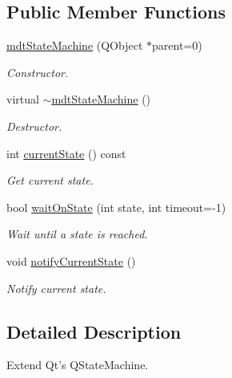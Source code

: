\subsection*{Public Member Functions}
\begin{DoxyCompactItemize}
\item 
\hyperlink{classmdt_state_machine_af2b15b9b0bbf48c6adb75a69dd255718}{mdtStateMachine} (QObject $\ast$parent=0)
\begin{DoxyCompactList}\small\item\em Constructor. \end{DoxyCompactList}\item 
\hypertarget{classmdt_state_machine_ac32776aa0587ec290576e6e2cafb631f}{
virtual \hyperlink{classmdt_state_machine_ac32776aa0587ec290576e6e2cafb631f}{$\sim$mdtStateMachine} ()}
\label{classmdt_state_machine_ac32776aa0587ec290576e6e2cafb631f}

\begin{DoxyCompactList}\small\item\em Destructor. \end{DoxyCompactList}\item 
\hypertarget{classmdt_state_machine_a16a99b2d6d077e1ea39622ef0e2b5a5b}{
int \hyperlink{classmdt_state_machine_a16a99b2d6d077e1ea39622ef0e2b5a5b}{currentState} () const }
\label{classmdt_state_machine_a16a99b2d6d077e1ea39622ef0e2b5a5b}

\begin{DoxyCompactList}\small\item\em Get current state. \end{DoxyCompactList}\item 
bool \hyperlink{classmdt_state_machine_ab14dc03757e493d35d510af8a1b436b6}{waitOnState} (int state, int timeout=-\/1)
\begin{DoxyCompactList}\small\item\em Wait until a state is reached. \end{DoxyCompactList}\item 
void \hyperlink{classmdt_state_machine_a6fa653fc7e2ea8a58e2d160ba6d96013}{notifyCurrentState} ()
\begin{DoxyCompactList}\small\item\em Notify current state. \end{DoxyCompactList}\end{DoxyCompactItemize}


\subsection{Detailed Description}
Extend Qt's QStateMachine. 

